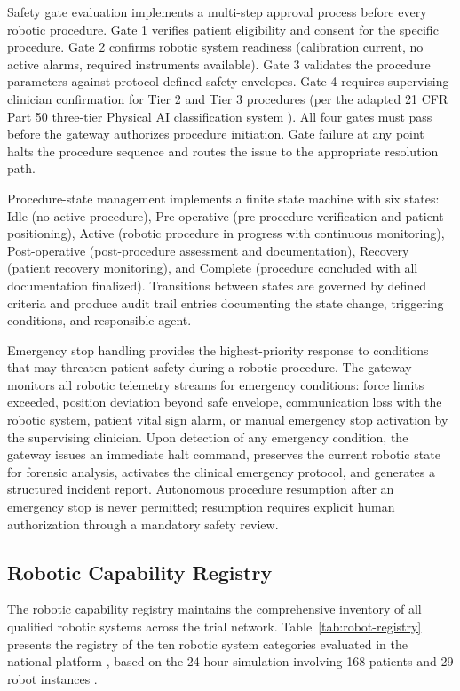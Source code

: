 Safety gate evaluation implements a multi-step approval process before every robotic
procedure. Gate 1 verifies patient eligibility and consent for the specific procedure.
Gate 2 confirms robotic system readiness (calibration current, no active alarms, required
instruments available). Gate 3 validates the procedure parameters against protocol-defined
safety envelopes. Gate 4 requires supervising clinician confirmation for Tier 2 and Tier 3
procedures (per the adapted 21 CFR Part 50 three-tier Physical AI classification system
\cite{cfr50-adapt}). All four gates must pass before the gateway authorizes procedure
initiation. Gate failure at any point halts the procedure sequence and routes the issue to
the appropriate resolution path.

Procedure-state management implements a finite state machine with six states: Idle (no active
procedure), Pre-operative (pre-procedure verification and patient positioning), Active
(robotic procedure in progress with continuous monitoring), Post-operative (post-procedure
assessment and documentation), Recovery (patient recovery monitoring), and Complete (procedure
concluded with all documentation finalized). Transitions between states are governed by
defined criteria and produce audit trail entries documenting the state change, triggering
conditions, and responsible agent.

Emergency stop handling provides the highest-priority response to conditions that may
threaten patient safety during a robotic procedure. The gateway monitors all robotic
telemetry streams for emergency conditions: force limits exceeded, position deviation beyond
safe envelope, communication loss with the robotic system, patient vital sign alarm, or
manual emergency stop activation by the supervising clinician. Upon detection of any
emergency condition, the gateway issues an immediate halt command, preserves the current
robotic state for forensic analysis, activates the clinical emergency protocol, and generates
a structured incident report. Autonomous procedure resumption after an emergency stop is
never permitted; resumption requires explicit human authorization through a mandatory
safety review.

\subsection{Robotic Capability Registry}

The robotic capability registry maintains the comprehensive inventory of all qualified
robotic systems across the trial network. Table~\ref{tab:robot-registry} presents the
registry of the ten robotic system categories evaluated in the national platform
\cite{national-platform-paper}, based on the 24-hour simulation involving 168 patients
and 29 robot instances \cite{main-repo}.

